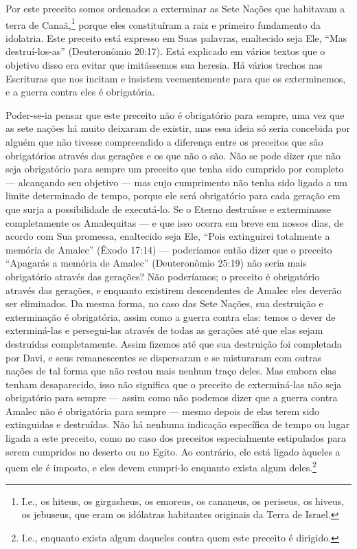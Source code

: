 Por este preceito somos ordenados a exterminar as Sete Nações que
habitavam a terra de Canaã,\footnote{I.e., os hiteus, os girgasheus, os emoreus, os cananeus, os periseus,
  os hiveus, os jebuseus, que eram os idólatras habitantes originais da
  Terra de Israel.} porque eles
constituíram a raiz e primeiro fundamento da idolatria. Este preceito
está expresso em Suas palavras, enaltecido seja Ele, ``Mas
destruí-los-as'' (Deuteronômio 20:17). Está explicado em vários textos
que o objetivo disso era evitar que imitássemos sua heresia. Há vários
trechos nas Escrituras que nos incitam e insistem veementemente para que
os exterminemos, e a guerra contra eles é obrigatória.

Poder-se-ia pensar que este preceito não é obrigatório para sempre, uma
vez que as sete nações há muito deixaram de existir, mas essa ideia só
seria concebida por alguém que não tivesse compreendido a diferença
entre os preceitos que são obrigatórios através das gerações e os que não o são. Não
se pode dizer que não seja obrigatório para sempre um preceito que
tenha sido cumprido por completo --- alcançando seu objetivo --- mas
cujo cumprimento não tenha sido ligado a um limite determinado de tempo,
porque ele será obrigatório para cada geração em que surja a
possibilidade de executá-lo. Se o Eterno destruísse e exterminasse
completamente os Amalequitas --- e que isso ocorra em breve em nossos
dias, de acordo com Sua promessa, enaltecido seja Ele, ``Pois
extinguirei totalmente a memória de Amalec'' (Êxodo 17:14) ---
poderíamos então dizer que o preceito ``Apagarás a memória de Amalec''
(Deuteronômio 25:19) não seria mais obrigatório através das gerações?
Não poderíamos; o preceito é obrigatório através das gerações, e
enquanto existirem descendentes de Amalec eles deverão ser eliminados.
Da mesma forma, no caso das Sete Nações, sua destruição e exterminação é
obrigatória, assim como a guerra contra elas: temos o dever de
exterminá-las e persegui-las através de todas as gerações até que elas
sejam destruídas completamente. Assim fizemos até que sua destruição foi
completada por Davi, e seus remanescentes se dispersaram e se misturaram
com outras nações de tal forma que não restou mais nenhum traço deles.
Mas embora elas tenham desaparecido, isso não significa que o preceito
de exterminá-las não seja obrigatório para sempre --- assim como não
podemos dizer que a guerra contra Amalec não é obrigatória para sempre
--- mesmo depois de elas terem sido extinguidas e destruídas. Não há
nenhuma indicação específica de tempo ou lugar ligada a este preceito, como no caso dos
preceitos especialmente estipulados para serem cumpridos no deserto ou no Egito.
Ao contrário, ele está ligado àqueles a quem ele é imposto, e eles devem
cumpri-lo enquanto exista algum deles.\footnote{I.e., enquanto exista algum daqueles contra quem este preceito é dirigido.}

